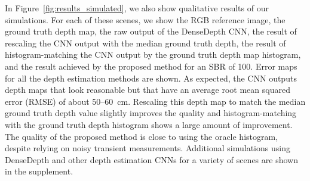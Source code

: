 In Figure~\ref{fig:results_simulated}, we also show qualitative results of our
simulations. For each of these scenes, we show the RGB reference image, the
ground truth depth map, the raw output of the DenseDepth CNN, the result of
rescaling the CNN output with the median ground truth depth, the result of
histogram-matching the CNN output by the ground truth depth map histogram, and
the result achieved by the proposed method for an SBR of 100. Error maps for all
the depth estimation methods are shown. As expected, the CNN outputs depth maps
that look reasonable but that have an average root mean squared error (RMSE) of
about 50--60~cm. Rescaling this depth map to match the median ground truth depth
value slightly improves the quality and histogram-matching with the ground
truth depth histogram shows a large amount of improvement. The quality of the
proposed method is close to using the oracle histogram, despite relying on
noisy transient measurements. Additional simulations using DenseDepth and other
depth estimation CNNs for a variety of scenes are shown in the supplement.
